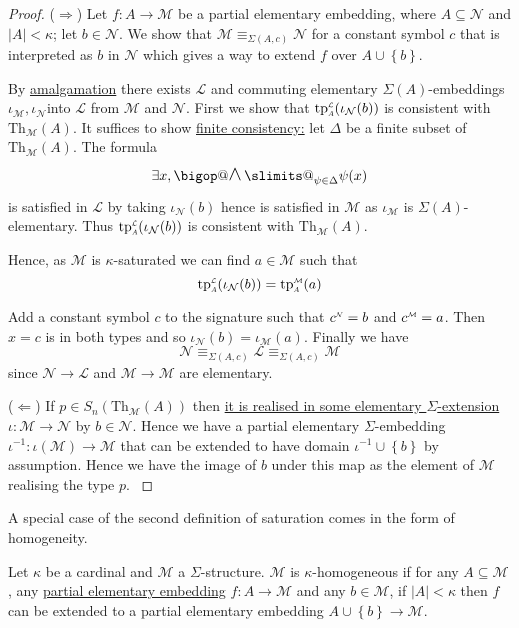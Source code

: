 \documentclass{book}
\makeatletter
\renewcommand{\implies}{\Rightarrow}
\newcommand{\limplies}{\Leftarrow}
\newenvironment{forward}{($\implies$)}{}
\newenvironment{backward}{($\limplies$)}{}
\DeclareRobustCommand\bigop[1]{%
  \mathop{\vphantom{\sum}\mathpalette\bigop@{#1}}\slimits@
}
\newcommand{\bigop@}[2]{%
  \vcenter{%
    \sbox\z@{$#1\sum$}%
    \hbox{\resizebox{
      \ifx#1\displaystyle.7\fi\dimexpr\ht\z@+\dp\z@}{!}{$\m@th#2$}}%
  }%
}
\newcommand{\bigand}[2]{\DOTSB\bigop{\mbox{\Large$\land$}}_{#1}^{#2}}
\newcommand{\set}[1]{\left\{#1\right\}}
\newcommand{\subs}{\subseteq}
\newcommand{\io}{\iota}
\newcommand{\ka}{\kappa}
\newcommand{\De}{\Delta}
\newcommand{\Si}{\Sigma}
\newcommand{\LL}{\mathcal{L}}
\newcommand{\MM}{\mathcal{M}}
\newcommand{\NN}{\mathcal{N}}
\newcommand{\abs}[1]{\left\vert #1 \right\vert}
\newcommand{\<}{\langle}
\renewcommand{\>}{\rangle}
\newcommand{\subintp}[3]{
    {#3}_{\text{\scalebox{0.7}{$#1$}}}^{
    \text{\scalebox{0.7}{$#2$}}}}
\newcommand{\modintp}[2]{#2^\text{\scalebox{0.7}{$#1$}}}
\newcommand{\mmintp}[1]{\modintp{\MM}{#1}}
\newcommand{\nnintp}[1]{\modintp{\NN}{#1}}
\newcommand{\Theory}{\mathrm{Th}}
\DeclareMathOperator{\tp}{tp}
\newcommand{\linkto}[2]{\hyperlink{#1}{#2}}
\theoremstyle{definitionstyle}
\theoremstyle{exercisestyle}
\theoremstyle{remarkstyle}
\makeatother
\begin{document}
\begin{proof}
    \begin{forward}
        Let $f : A \to \MM$ be a partial elementary embedding,
        where $A \subs \NN$ and $\abs{A} < \ka$; let $b \in \NN$.
        We show that $\MM \equiv_{\Si(A,c)} \NN$
        for a constant symbol $c$ that is interpreted as $b$ in $\NN$
        which gives a way to extend $f$ over $A \cup \set{b}$.

        By \linkto{amalgamation}{amalgamation} there exists $\LL$ and 
        commuting elementary $\Si(A)$-embeddings $\io_\MM,\io_\NN$into 
        $\LL$ from $\MM$ and $\NN$.
        First we show that $\subintp{A}{\LL}{\tp}(\io_\NN(b))$ is consistent 
        with $\Theory_\MM(A)$.
        It suffices to show \linkto{compactness_for_types}{finite consistency:} 
        let $\De$ be a finite subset of $\Theory_\MM(A)$. 
        The formula
        \[\exists x, \bigand{\psi \in \De}{} \psi(x)\]
        is satisfied in $\LL$ by taking $\io_\NN(b)$ hence is satisfied in 
        $\MM$ as $\io_\MM$ is $\Si(A)$-elementary.
        Thus $\subintp{A}{\LL}{\tp}(\io_\NN(b))$ is consistent 
        with $\Theory_\MM(A)$.

        Hence, as $\MM$ is $\ka$-saturated we can find $a \in \MM$ such that 
        \[
            \subintp{A}{\LL}{\tp}(\io_\NN(b)) = 
            \subintp{A}{\MM}{\tp}(a)
        \]

        Add a constant symbol $c$ to the signature such that 
        $\nnintp{c} = b$ and $\mmintp{c} = a$.
        Then $x = c$ is in both types and so $\io_\NN(b) = \io_\MM (a)$.
        Finally we have 
        \[\NN \equiv_{\Si(A,c)} \LL \equiv_{\Si(A,c)} \MM\]
        since $\NN \to \LL$ and $\MM \to \MM$ are elementary.
    \end{forward}

    \begin{backward}
        If $p \in S_n(\Theory_\MM(A))$ then \linkto{}{it is realised 
        in some elementary $\Si$-extension} $\io : \MM \to \NN$
        by $b \in \NN$.
        Hence we have a partial elementary $\Si$-embedding 
        $\io^{-1} : \io(\MM) \to \MM$ that can be extended to have domain 
        $\io^{-1} \cup \set{b}$ by assumption.
        Hence we have the image of $b$ under this map as the element of $\MM$ 
        realising the type $p$.
    \end{backward}
\end{proof}

A special case of the second definition of 
saturation comes in the form of homogeneity.
\begin{dfn}[$\ka$-homogeneity]
    Let $\ka$ be a cardinal and $\MM$ a $\Si$-structure.
    $\MM$ is $\ka$-homogeneous 
    if for any $A \subs \MM$, 
    any \linkto{partial_morph_dfn}{partial elementary embedding} 
    $f : A \to \MM$ and any $b \in \MM$, 
    if $\abs{A} < \ka$ then 
    $f$ can be extended to a partial elementary embedding 
    $A \cup \set{b} \to \MM$.
\end{dfn}
\end{document}
